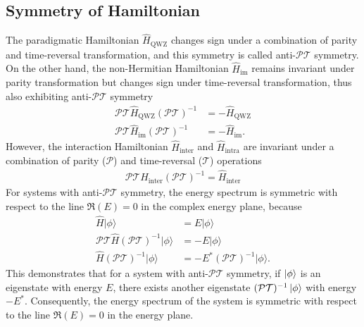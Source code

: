 \documentclass[longbibliography, aps, prx, amsmath, amssymb, amsfonts, twocolumn,superscriptaddress, footinbib]{revtex4-1}
\begin{document}
	\subsection{Symmetry of Hamiltonian}
	The paradigmatic Hamiltonian $\hat{H}_{\text{QWZ}}$ changes sign under a combination of parity and time-reversal transformation, and this symmetry is called anti-$\mathcal{PT}$ symmetry.
	On the other hand, the non-Hermitian Hamiltonian $\hat{H}_{\text{im}}$ remains invariant under parity transformation but changes sign under time-reversal transformation, thus also exhibiting anti-$\mathcal{PT}$ symmetry
	\begin{equation}
		\begin{split}
			\mathcal{PT} \hat{H}_{\text{QWZ}} (\mathcal{PT})^{-1} &= -\hat{H}_{\text{QWZ}} \\
			\mathcal{PT} \hat{H}_{\text{im}} (\mathcal{PT})^{-1} &= -\hat{H}_{\text{im}}.
		\end{split}
	\end{equation}
	However, the interaction Hamiltonian $\hat{H}_{\text{inter}}$ and $\hat{H}_{\text{intra}}$ are invariant under a combination of parity ($\mathcal{P}$) and time-reversal ($\mathcal{T}$) operations
	\begin{equation}
		\begin{split}
			\mathcal{PT} \hat{H}_{\text{inter}} (\mathcal{PT})^{-1} = \hat{H}_{\text{inter}}%
		\end{split}
	\end{equation}
	For systems with anti-$\mathcal{PT}$ symmetry, the energy spectrum is symmetric with respect to the line $\Re(E)=0$ in the complex energy plane, because
	\begin{equation}
		\begin{split}
			\hat{H} \vert \phi \rangle &= E \vert \phi \rangle\\
			\mathcal{PT} \hat{H} (\mathcal{PT})^{-1} \vert \phi \rangle &= - E \vert \phi \rangle\\
			\hat{H} (\mathcal{PT})^{-1} \vert \phi \rangle &= - E^* (\mathcal{PT})^{-1} \vert \phi \rangle.
		\end{split}
	\end{equation}
	This demonstrates that for a system with anti-$\mathcal{PT}$ symmetry, if $\ket{\phi}$ is an eigenstate with energy $E$, there exists another eigenstate $(\mathcal{PT})^{-1} \ket{\phi}$ with energy $-E^*$. Consequently, the energy spectrum of the system is symmetric with respect to the line $\Re(E)=0$ in the energy plane.
\end{document}
